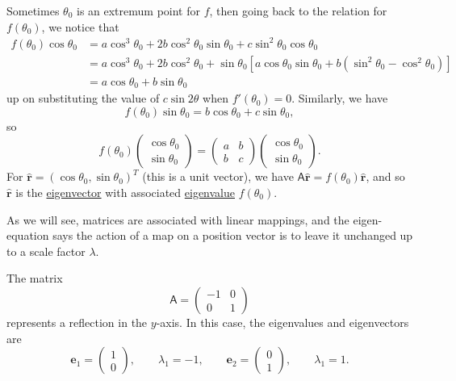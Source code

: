 \documentclass[10pt,notitlepage]{revtex4-1}
\newenvironment{example}[1][Example]{\begin{trivlist}
\item[\hskip \labelsep {\bfseries #1}]}{\end{trivlist}}
\newcommand{\eb}{\boldsymbol{e}}
\begin{document}
Sometimes $\theta_0$ is an extremum point for $f$, then going back to the
relation for $f(\theta_0)$, we notice that
\begin{equation}\begin{aligned}
	f(\theta_0)\cos\theta_0 &= a\cos^3\theta_0 + 2b\cos^2\theta_0 \sin\theta_0
	+c\sin^2\theta_0 \cos\theta_0\\
	&= a\cos^3\theta_0 + 2b\cos^2\theta_0
	+\sin\theta_0[a\cos\theta_0 \sin\theta_0 +b(\sin^2\theta_0 -\cos^2\theta_0)]
	\\ &=a\cos\theta_0 + b\sin\theta_0
\end{aligned}\end{equation}
up on substituting the value of $c\sin2\theta$ when $f'(\theta_0)=0$. Similarly,
we have
\begin{equation}
	f(\theta_0)\sin\theta_0 = b\cos\theta_0 + c\sin\theta_0,
\end{equation}
so
\begin{equation}
	f(\theta_0)\begin{pmatrix}\cos\theta_0 \\ \sin\theta_0\end{pmatrix}
	=\begin{pmatrix}a & b\\ b & c\end{pmatrix}
	\begin{pmatrix}\cos\theta_0 \\ \sin\theta_0\end{pmatrix}.
\end{equation}
For $\hat{\mathbf{r}}=(\cos\theta_0, \sin\theta_0)^T$ (this is a unit vector),
we have $\mathsf{A}\hat{\mathbf{r}}=f(\theta_0)\hat{\mathbf{r}}$, and so
$\hat{\mathbf{r}}$ is the \underline{eigenvector} with associated
\underline{eigenvalue} $f(\theta_0)$.

As we will see, matrices are associated with linear mappings, and the
eigen-equation says the action of a map on a position vector is to leave it
unchanged up to a scale factor $\lambda$.
\begin{example}
	The matrix
	\begin{equation}
		\mathsf{A}=\begin{pmatrix}-1 & 0\\ 0 & 1\end{pmatrix}
	\end{equation}
	represents a reflection in the $y$-axis. In this case, the eigenvalues and
	eigenvectors are
	\begin{equation}
		\eb_1=\begin{pmatrix}1\\0\end{pmatrix},\qquad \lambda_1=-1,\qquad
		\eb_2=\begin{pmatrix}0\\1\end{pmatrix},\qquad \lambda_1=1.
	\end{equation}
\end{example}
\end{document}
